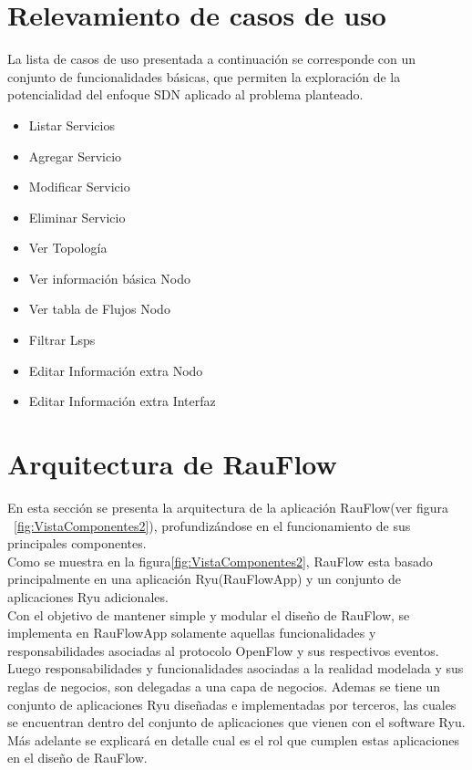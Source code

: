 \section[Relevamiento de casos de uso]{Relevamiento de casos de uso}

La lista de casos de uso presentada a continuaci\'on se corresponde con un conjunto de funcionalidades b\'asicas, que permiten la exploraci\'on de la potencialidad del enfoque SDN aplicado al problema planteado. 

\begin{itemize}
\item Listar Servicios
\item Agregar Servicio
\item Modificar Servicio
\item Eliminar Servicio
\item Ver Topolog\'ia
\item Ver informaci\'on b\'asica Nodo
\item Ver tabla de Flujos Nodo
\item Filtrar Lsps
\item Editar Informaci\'on extra Nodo
\item Editar Informaci\'on extra Interfaz
\end{itemize}

\section[Arquitectura de RauFlow]{Arquitectura de RauFlow}

En esta secci\'on se presenta la arquitectura de la aplicación RauFlow(ver figura ~\ref{fig:VistaComponentes2}), profundizándose en el funcionamiento de sus principales componentes.\\

Como se muestra en la figura\ref{fig:VistaComponentes2}, RauFlow esta basado principalmente en una aplicaci\'on Ryu(RauFlowApp) y un conjunto de aplicaciones Ryu adicionales.\\ 

Con el objetivo de mantener simple y modular el dise\~no de RauFlow, se implementa en RauFlowApp solamente aquellas funcionalidades y responsabilidades asociadas al protocolo OpenFlow y sus respectivos eventos. Luego responsabilidades y funcionalidades asociadas a la realidad modelada y sus reglas de negocios, son delegadas a una capa de negocios. Ademas se tiene un conjunto de aplicaciones Ryu dise\~nadas e implementadas por terceros, las cuales se encuentran dentro del conjunto de aplicaciones que vienen con el software Ryu. M\'as adelante se explicar\'a en detalle cual es el rol que cumplen estas aplicaciones en el dise\~no de RauFlow.

